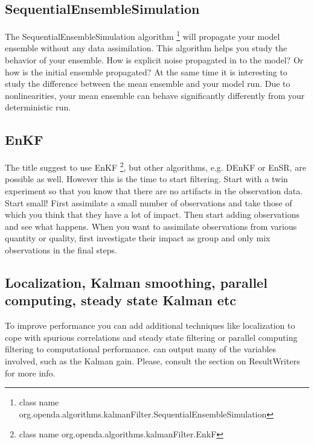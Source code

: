 \subsection{SequentialEnsembleSimulation}\label{Sec:SequentialEnsembleSimulation}
The SequentialEnsembleSimulation algorithm \footnote{class name org.openda.algorithms.kalmanFilter.SequentialEnsembleSimulation} will propagate your model ensemble without any data assimilation. This algorithm helps you study the behavior of your ensemble. How is explicit noise propagated in to the model? Or how is the initial ensemble propagated? At the same time it is interesting to study the difference between the mean ensemble and your model run. Due to nonlinearities, your mean ensemble can behave significantly differently from your deterministic run.

\subsection{EnKF}
The title suggest to use EnKF  \footnote{class name org.openda.algorithms.kalmanFilter.EnkF}, but other algorithms, e.g. DEnKF or EnSR, are possible as well. However this is the time to start filtering. Start with a twin experiment so that you know that there are no artifacts in the observation data. Start small! First assimilate a small number of observations and take those of which you think that they have a lot of impact. Then start adding observations and see what happens. When you want to assimilate observations from various quantity or quality, first investigate their impact as group and only mix observations in the final steps.

\subsection{Localization, Kalman smoothing, parallel computing, steady state Kalman etc}
To improve performance you can add additional techniques like localization to cope with spurious correlations and steady state filtering or parallel computing filtering to computational performance. \oda can output many of the variables involved, such as the Kalman gain. Please, consult the section on ResultWriters for more info.


